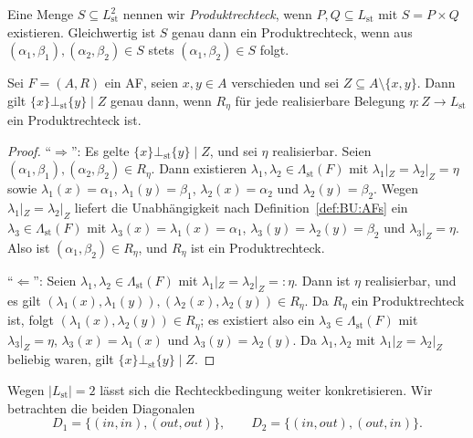Eine Menge \(S\subseteq L_{\mathrm{st}}^2\) nennen wir \emph{Produktrechteck},
wenn \(P,Q\subseteq L_{\mathrm{st}}\) mit \(S=P\times Q\) existieren.
Gleichwertig ist \(S\) genau dann ein Produktrechteck, wenn aus
\((\alpha_1,\beta_1),(\alpha_2,\beta_2)\in S\) stets
\((\alpha_1,\beta_2)\in S\) folgt.

\begin{Proposition}
    \label{prop:singl-rechteck}
    Sei \(F=(A,R)\) ein AF, seien \(x,y\in A\) verschieden und sei
    \(Z\subseteq A\setminus\{x,y\}\). Dann gilt
    \(\{x\}\bot_{\mathrm{st}}\{y\}\mid Z\) genau dann, wenn \(R_\eta\) für jede
    realisierbare Belegung \(\eta:Z\to L_{\mathrm{st}}\) ein Produktrechteck
    ist.
\end{Proposition}

\begin{proof}
    \label{pr:singl-rechteck}
    ``\(\Rightarrow\)'': Es gelte \(\{x\}\bot_{\mathrm{st}}\{y\}\mid Z\), und
    sei \(\eta\) realisierbar. Seien
    \((\alpha_1,\beta_1),(\alpha_2,\beta_2)\in R_\eta\). Dann existieren
    \(\lambda_1,\lambda_2\in\Lambda_{\mathrm{st}}(F)\) mit
    \(\lambda_1|_Z=\lambda_2|_Z=\eta\) sowie \(\lambda_1(x)=\alpha_1\),
    \(\lambda_1(y)=\beta_1\), \(\lambda_2(x)=\alpha_2\) und
    \(\lambda_2(y)=\beta_2\). Wegen \(\lambda_1|_Z=\lambda_2|_Z\) liefert die
    Unabhängigkeit nach Definition~\ref{def:BU:AFs} ein
    \(\lambda_3\in\Lambda_{\mathrm{st}}(F)\) mit
    \(\lambda_3(x)=\lambda_1(x)=\alpha_1\),
    \(\lambda_3(y)=\lambda_2(y)=\beta_2\) und \(\lambda_3|_Z=\eta\). Also ist
    \((\alpha_1,\beta_2)\in R_\eta\), und \(R_\eta\) ist ein Produktrechteck.

    ``\(\Leftarrow\)'': Seien
    \(\lambda_1,\lambda_2\in\Lambda_{\mathrm{st}}(F)\) mit
    \(\lambda_1|_Z=\lambda_2|_Z=:\eta\). Dann ist \(\eta\) realisierbar, und es
    gilt \((\lambda_1(x),\lambda_1(y)),(\lambda_2(x),\lambda_2(y))\in R_\eta\).
    Da \(R_\eta\) ein Produktrechteck ist, folgt
    \((\lambda_1(x),\lambda_2(y))\in R_\eta\); es existiert also ein
    \(\lambda_3\in\Lambda_{\mathrm{st}}(F)\) mit \(\lambda_3|_Z=\eta\),
    \(\lambda_3(x)=\lambda_1(x)\) und \(\lambda_3(y)=\lambda_2(y)\). Da
    \(\lambda_1,\lambda_2\) mit \(\lambda_1|_Z=\lambda_2|_Z\) beliebig waren,
    gilt \(\{x\}\bot_{\mathrm{st}}\{y\}\mid Z\).
\end{proof}

Wegen \(|L_{\mathrm{st}}|=2\) lässt sich die Rechteckbedingung weiter
konkretisieren. Wir betrachten die beiden Diagonalen
\[
    D_1=\{(\mathit{in},\mathit{in}),(\mathit{out},\mathit{out})\},
    \qquad
    D_2=\{(\mathit{in},\mathit{out}),(\mathit{out},\mathit{in})\}.
\]

